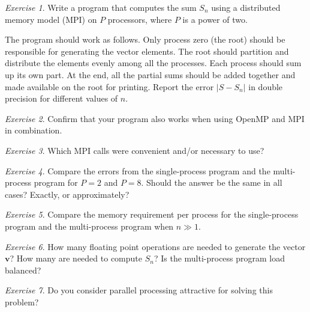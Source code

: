 \documentclass[onecolumn, oneside, a4paper, 11pt]{memoir}
\theoremstyle{remark}
\newtheorem{ex}{Exercise}
\begin{document}
\begin{ex}
  Write a program that computes the sum $S_n$ using a distributed memory model
  (MPI) on $P$ processors, where $P$ is a power of two.

  The program should work as follows. Only process zero (the root) should be
  responsible for generating the vector elements. The root should partition and
  distribute the elements evenly among all the processes. Each process should
  sum up its own part. At the end, all the partial sums should be added together
  and made available on the root for printing. Report the error $|S-S_n|$ in
  double precision for different values of $n$.
\end{ex}

\begin{ex}
  Confirm that your program also works when using OpenMP and MPI in
  combination.
\end{ex}

\begin{ex}
  Which MPI calls were convenient and/or necessary to use?
\end{ex}

\begin{ex}
  Compare the errors from the single-process program and the multi-process
  program for $P=2$ and $P=8$. Should the answer be the same in all cases?
  Exactly, or approximately?
\end{ex}

\begin{ex}
  Compare the memory requirement per process for the single-process program and
  the multi-process program when $n \gg 1$.
\end{ex}

\begin{ex}
  How many floating point operations are needed to generate the vector $\bm v$?
  How many are needed to compute $S_n$? Is the multi-process program load
  balanced?
\end{ex}

\begin{ex}
  Do you consider parallel processing attractive for solving this problem?
\end{ex}
\end{document}
